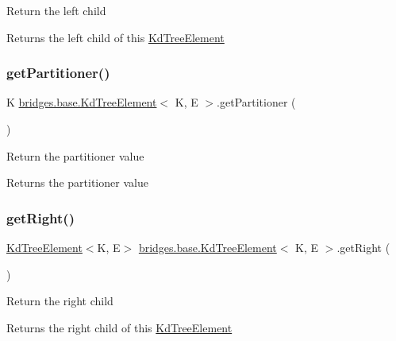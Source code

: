 Return the left child

\begin{DoxyReturn}{Returns}
the left child of this \hyperlink{classbridges_1_1base_1_1_kd_tree_element}{Kd\+Tree\+Element} 
\end{DoxyReturn}
\mbox{\label{classbridges_1_1base_1_1_kd_tree_element_a56864f8bc411dd4bfd624fb322b0640b}} 
\subsubsection{\texorpdfstring{get\+Partitioner()}{getPartitioner()}}
{\footnotesize\ttfamily K \hyperlink{classbridges_1_1base_1_1_kd_tree_element}{bridges.\+base.\+Kd\+Tree\+Element}$<$ K, E $>$.get\+Partitioner (\begin{DoxyParamCaption}{ }\end{DoxyParamCaption})}

Return the partitioner value

\begin{DoxyReturn}{Returns}
the partitioner value 
\end{DoxyReturn}
\mbox{\label{classbridges_1_1base_1_1_kd_tree_element_a990694a36d44aba5f844f1752692c8e6}} 
\subsubsection{\texorpdfstring{get\+Right()}{getRight()}}
{\footnotesize\ttfamily \hyperlink{classbridges_1_1base_1_1_kd_tree_element}{Kd\+Tree\+Element}$<$K, E$>$ \hyperlink{classbridges_1_1base_1_1_kd_tree_element}{bridges.\+base.\+Kd\+Tree\+Element}$<$ K, E $>$.get\+Right (\begin{DoxyParamCaption}{ }\end{DoxyParamCaption})}

Return the right child

\begin{DoxyReturn}{Returns}
the right child of this \hyperlink{classbridges_1_1base_1_1_kd_tree_element}{Kd\+Tree\+Element} 
\end{DoxyReturn}
\mbox{\label{classbridges_1_1base_1_1_kd_tree_element_a27c0b086af284210855ee5f1c90e7484}} 
